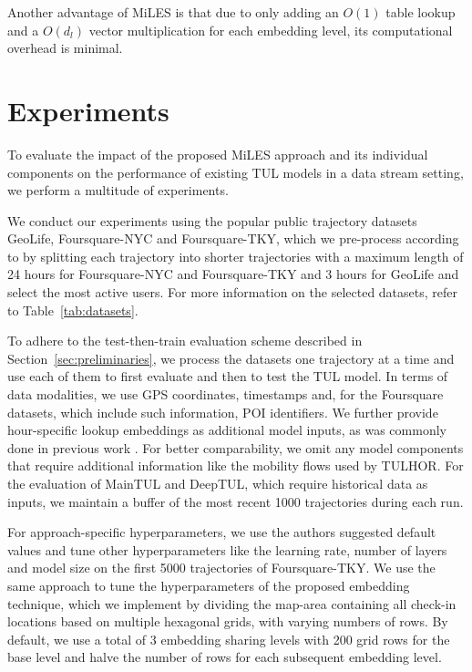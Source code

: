 \documentclass{article} %
\theoremstyle{definition}
\begin{document}
Another advantage of MiLES is that due to only adding an $O(1)$ table lookup and a $O(d_l)$ vector multiplication for each embedding level, its computational overhead is minimal.

\section{Experiments}

To evaluate the impact of the proposed MiLES approach and its individual components on the performance of existing TUL models in a data stream setting, we perform a multitude of experiments.

We conduct our experiments using the popular public trajectory datasets GeoLife, Foursquare-NYC and Foursquare-TKY, which we pre-process according to \citet{chenMutualDistillationLearning2022a} by splitting each trajectory into shorter trajectories with a maximum length of 24 hours for Foursquare-NYC and Foursquare-TKY and 3 hours for GeoLife and select the most active users.
For more information on the selected datasets, refer to Table~\ref{tab:datasets}.

To adhere to the test-then-train evaluation scheme described in Section~\ref{sec:preliminaries}, we process the datasets one trajectory at a time and use each of them to first evaluate and then to test the TUL model.
In terms of data modalities, we use GPS coordinates, timestamps and, for the Foursquare datasets, which include such information, POI identifiers.
We further provide hour-specific lookup embeddings as additional model inputs, as was commonly done in previous work \citep[see e.g.][]{chenMutualDistillationLearning2022a,miaoTrajectoryUserLinkingAttentive2020}.
For better comparability, we omit any model components that require additional information like the mobility flows used by TULHOR.
For the evaluation of MainTUL and DeepTUL, which require historical data as inputs, we maintain a buffer of the most recent 1000 trajectories during each run.

For approach-specific hyperparameters, we use the authors suggested default values and tune other hyperparameters like the learning rate, number of layers and model size on the first 5000 trajectories of Foursquare-TKY.
We use the same approach to tune the hyperparameters of the proposed embedding technique, which we implement by dividing the map-area containing all check-in locations based on multiple hexagonal grids, with varying numbers of rows.
By default, we use a total of 3 embedding sharing levels with 200 grid rows for the base level and halve the number of rows for each subsequent embedding level.
\end{document}
